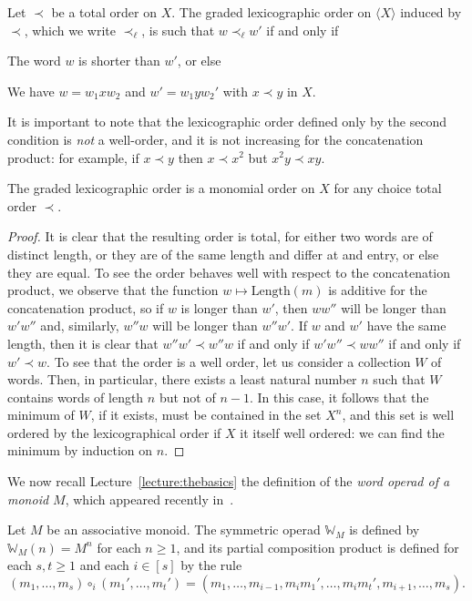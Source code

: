 \begin{definition}
Let $\prec$ be a total order on $X$. 
The graded lexicographic order on $\langle X\rangle$
induced by $\prec$, which we write $\prec_\ell$,
is such that $w\prec_\ell w'$ if and only if
\begin{tenumerate}
\item The word $w$ is shorter than $w'$, or else
\item We have
$w = w_1 xw_2$ and $w' = w_1 y w_2'$ with
$x\prec y$ in $X$.
\end{tenumerate}
\end{definition}

It is important to note that the lexicographic order defined only
by the second condition is \emph{not} a well-order, and it is 
not increasing for the concatenation product: for example,
if $x\prec y$ then $x \prec x^2$ but $x^2y \prec xy$. 

\begin{lemma}
The graded lexicographic order is a monomial order on $X$
for any choice total order $\prec$.
\end{lemma}

\begin{proof}
It is clear that the resulting order is total, for either
two words are of distinct length, or they are of the same length
and differ at and entry, or else they are equal. To see the
order behaves well with respect to the concatenation product,
we observe that the function $w\longmapsto \mathrm{Length}(m)$
is additive for the concatenation product, so if $w$ is longer
than $w'$, then $ww''$ will be longer than $w'w''$ and,
similarly, $w''w$ will be longer than $w''w'$. If $w$ and 
$w'$ have the same length, then it is clear that
$w''w'\prec w''w$ if and only if $w'w''\prec ww''$ if
and only if $w' \prec w$. To see that the order is a well
order, let us consider a collection $W$ of words. Then,
in particular, there exists a least natural number $n$
such that $W$ contains words of length $n$ but not of $n-1$. 
In this case, it follows that the minimum of $W$, if it
exists, must be contained in the set $X^n$, and this
set is well ordered by the lexicographical order if
$X$ it itself well ordered: we can find the minimum 
by induction on $n$.
\end{proof}

We now recall Lecture~\ref{lecture:thebasics} the 
definition
of the \emph{word operad of a monoid $M$},
which appeared recently in~\cite{Dotsenko2020}.


\begin{definition}
Let $M$ be an associative monoid. The symmetric
operad $\mathbb W_M$ is defined by $\mathbb{W}_M(n) =
M^n$ for each $n\geqslant 1$, and its partial composition
product is defined for each $s,t\geqslant 1$ and each
$i\in [s]$ by the rule
\[(m_1,\ldots,m_s) \circ_i (m_1',\ldots,m_t') = 
 	(m_1,\ldots,m_{i-1}, m_im_1',\ldots,m_im_t',m_{i+1},\ldots, m_s).\] 
\end{definition}

